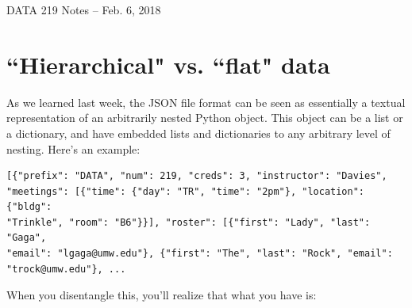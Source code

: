\documentclass[12pt]{article}
\begin{document}
\begin{center}
\begin{Large}
DATA 219 Notes -- Feb. 6, 2018
\end{Large}
\end{center}

\section{``Hierarchical" vs. ``flat" data}

As we learned last week, the JSON file format can be seen as essentially a
textual representation of an arbitrarily nested Python object. This object can
be a list or a dictionary, and have embedded lists and dictionaries to any
arbitrary level of nesting. Here's an example:

\begin{Verbatim}[fontsize=\small,samepage=true,frame=none]
[{"prefix": "DATA", "num": 219, "creds": 3, "instructor": "Davies",
"meetings": [{"time": {"day": "TR", "time": "2pm"}, "location": {"bldg":
"Trinkle", "room": "B6"}}], "roster": [{"first": "Lady", "last": "Gaga",
"email": "lgaga@umw.edu"}, {"first": "The", "last": "Rock", "email":
"trock@umw.edu"}, ...
\end{Verbatim}

When you disentangle this, you'll realize that what you have is:

\vspace{.2in}
\end{document}
